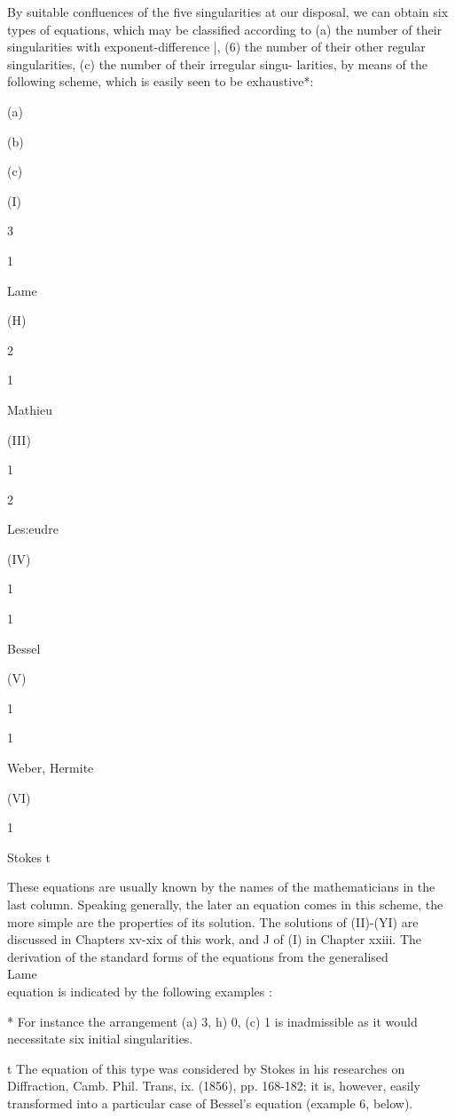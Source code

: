 By suitable confluences of the five singularities at our disposal, we
can obtain six types of equations, which may be classified according
to (a) the number of their singularities with exponent-difference |,
(6) the number of their other regular singularities, (c) the number of
their irregular singu- larities, by means of the following scheme,
which is easily seen to be exhaustive*:

(a)

(b)

(c)

(I)

3

1

Lame

(H)

2

1

Mathieu

(III)

1

2

Les:eudre

(IV)

1

1

Bessel

(V)

1

1

Weber, Hermite

(VI)

1

Stokes t

These equations are usually known by the names of the mathematicians
in the last column. Speaking generally, the later an equation comes in
this scheme, the more simple are the properties of its solution. The
solutions of (II)-(YI) are discussed in Chapters xv-xix of this work,
and J of (I) in Chapter xxiii. The derivation of the standard forms of
the equations from the generalised \\Lame\\ equation is indicated by the
following examples :

* For instance the arrangement (a) 3, h) 0, (c) 1 is inadmissible as
it would necessitate six initial singularities.

t The equation of this type was considered by Stokes in his researches
on Diffraction, Camb. Phil. Trans, ix. (1856), pp. 168-182; it is,
however, easily transformed into a particular case of Bessel's
equation (example 6, below).


